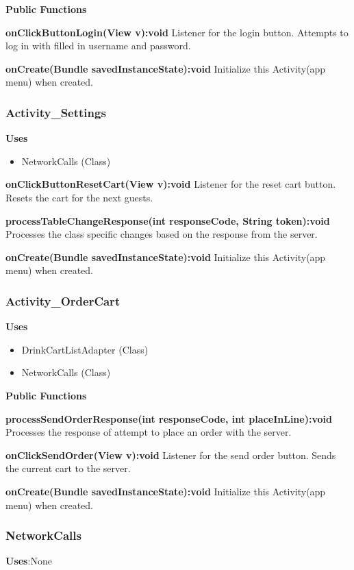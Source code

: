 \documentclass [10pt]{article}
\begin{document}
\textbf{Public Functions}

\textbf{onClickButtonLogin(View v):void}
Listener for the login button. Attempts to log in with filled in username and password.

\textbf{onCreate(Bundle savedInstanceState):void}
Initialize this Activity(app menu) when created.

\subsubsection{Activity\_Settings}

\textbf{Uses}
\begin{itemize}
	\item NetworkCalls (Class)
\end{itemize}

\textbf{onClickButtonResetCart(View v):void}
Listener for the reset cart button. Resets the cart for the next guests.

\textbf{processTableChangeResponse(int responseCode, String token):void}
Processes the class specific changes based on the response from the server.

\textbf{onCreate(Bundle savedInstanceState):void}
Initialize this Activity(app menu) when created.

\subsubsection{Activity\_OrderCart}

\textbf{Uses}
\begin{itemize}
	\item DrinkCartListAdapter (Class)
	\item NetworkCalls (Class)
\end{itemize}

\textbf{Public Functions}

\textbf{processSendOrderResponse(int responseCode, int placeInLine):void}
Processes the response of attempt to place an order with the server.

\textbf{onClickSendOrder(View v):void}
Listener for the send order button. Sends the current cart to the server.

\textbf{onCreate(Bundle savedInstanceState):void}
Initialize this Activity(app menu) when created.

\subsubsection{NetworkCalls}
\textbf{Uses}:None
\end{document}
